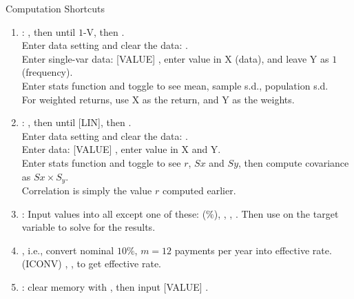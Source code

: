 \begin{method} Computation Shortcuts
\begin{enumerate}[label=\roman*.]
\setlength{\itemsep}{0pt}
\item {}:  , then   until $1$-V, then . \\
Enter data setting and clear the data:    .\\
Enter single-var data: [VALUE]  \fbox{\strut \ $\downarrow$\ } \fbox{\strut \ $\downarrow$\ }, enter value in X (data), and leave Y as $1$ (frequency).\\
Enter stats function and toggle \fbox{\strut \ $\downarrow$\ } to see mean, sample s.d., population s.d.\\
For weighted returns, use X as the return, and Y as the weights.
\item {}:  , then   until [LIN], then . \\
Enter data setting and clear the data:    .\\
Enter data: [VALUE]  \fbox{\strut \ $\downarrow$\ } \fbox{\strut \ $\downarrow$\ }, enter value in X and Y.\\
Enter stats function and toggle \fbox{\strut \ $\downarrow$\ } to see $r$, $Sx$ and $Sy$, then compute covariance as $Sx \times S_y$.\\
Correlation is simply the value $r$ computed earlier.
\item {}: Input values into all except one of these:   ($\%$), , , . Then use  on the target variable to solve for the results.
\item {}, i.e., convert nominal $10\%$, $m=12$ payments per year into effective rate.\\
  (ICONV) \fbox{\strut \ $\uparrow$\ } , \fbox{\strut $\downarrow$}  , \fbox{\strut $\downarrow$}  to get effective rate.
\item {}: clear memory with   , then input [VALUE]  \fbox{\strut $\downarrow$}.

\end{enumerate}
\end{method}
